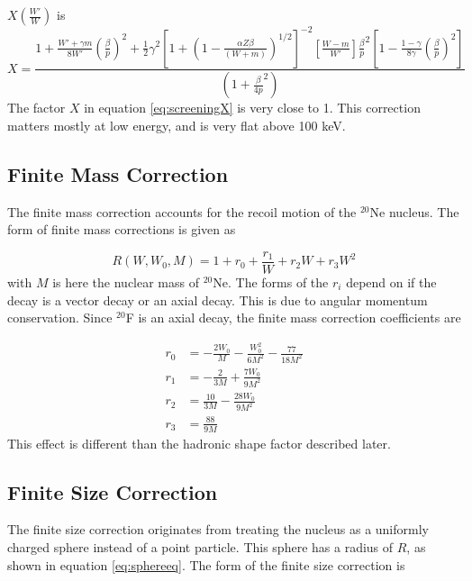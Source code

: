 \documentclass[../MaxHughesThesis.tex]{subfiles}
\begin{document}
$X(\frac{W'}{W})$ is %
\begin{equation}
	X = \frac{1 + \frac{W' + \gamma m}{8 W'} (\frac{\beta}{p})^{2} + \frac{1}{2}\gamma^{2}[1 + (1 - \frac{\alpha Z \beta}{(W + m)})^{1/2}]^{-2} [\frac{W - m}{W'}] \frac{\beta}{p}^{2}[1 - \frac{1 - \gamma}{8\gamma}(\frac{\beta}{p})^{2}]}{(1 + \frac{\beta}{4p}^{2})}
	\label{eq:screeningX}
\end{equation}
The factor $X$ in equation \ref{eq:screeningX} is very close to 1.
This correction matters mostly at low energy, and is very flat above 100 keV.

\subsection{Finite Mass Correction}
The finite mass correction accounts for the recoil motion of the $^{20}$Ne nucleus.
The form of finite mass corrections is given as \cite{WIL90} %

\begin{equation}
	R(W,W_{0},M) = 1 + r_{0} + \frac{r_{1}}{W} + r_{2}W + r_{3}W^{2}
	\label{eq:finitemass}
\end{equation}
with $M$ is here the nuclear mass of $^{20}$Ne.
The forms of the $r_{i}$ depend on if the decay is a vector decay or an axial decay. 
This is due to angular momentum conservation.
Since $^{20}$F is an axial decay, the finite mass correction coefficients are %

\begin{equation}
	\label{eq:finitemassrs}
	\begin{split}
	r_{0} & = -\frac{2W_{0}}{M} - \frac{W_{0}^{2}}{6M^{2}} - \frac{77}{18M^{2}} \\
	r_{1} & = -\frac{2}{3M} + \frac{7W_{0}}{9M^{2}} \\
	r_{2} & = \frac{10}{3M} - \frac{28W_{0}}{9M^{2}} \\
	r_{3} & = \frac{88}{9M}
	\end{split}
\end{equation}
This effect is different than the hadronic shape factor described later. 

\subsection{Finite Size Correction}
The finite size correction originates from treating the nucleus as a uniformly charged sphere instead of a point particle.
This sphere has a radius of $R$, as shown in equation \ref{eq:sphereeq}.
The form of the finite size correction is \cite{WIL90} %
\end{document}

